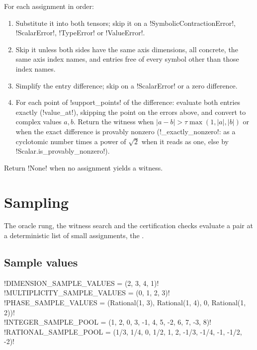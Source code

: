 \begin{algorithm}\label{alg:proofs-find-witness}
For each assignment in order:
\begin{enumerate}
\item Substitute it into both tensors; skip it on a \py!SymbolicContractionError!, \py!ScalarError!, \py!TypeError! or \py!ValueError!.
\item Skip it unless both sides have the same axis dimensions, all concrete, the same axis index names, and entries free of every symbol other than those index names.
\item Simplify the entry difference; skip on a \py!ScalarError! or a zero difference.
\item For each point of \py!support_points! of the difference: evaluate both entries exactly (\py!value_at!), skipping the point on the errors above, and convert to complex values $a,b$. Return the witness when $|a-b|>\tau\max(1,|a|,|b|)$ or when the exact difference is provably nonzero (\py!_exactly_nonzero!: as a cyclotomic number times a power of $\sqrt2$ when it reads as one, else by \py!Scalar.is_provably_nonzero!).
\end{enumerate}
Return \py!None! when no assignment yields a witness.
\end{algorithm}

\section{Sampling}\label{sec:proofs-sampling}

The oracle rung, the witness search and the certification checks evaluate a pair at a deterministic list of small assignments, the .

\subsection{Sample values}

\begin{signature}
\py!DIMENSION_SAMPLE_VALUES = (2, 3, 4, 1)!\\
\py!MULTIPLICITY_SAMPLE_VALUES = (0, 1, 2, 3)!\\
\py!PHASE_SAMPLE_VALUES = (Rational(1, 3), Rational(1, 4), 0, Rational(1, 2))!\\
\py!INTEGER_SAMPLE_POOL = (1, 2, 0, 3, -1, 4, 5, -2, 6, 7, -3, 8)!\\
\py!RATIONAL_SAMPLE_POOL = (1/3, 1/4, 0, 1/2, 1, 2, -1/3, -1/4, -1, -1/2, -2)!
\end{signature}

